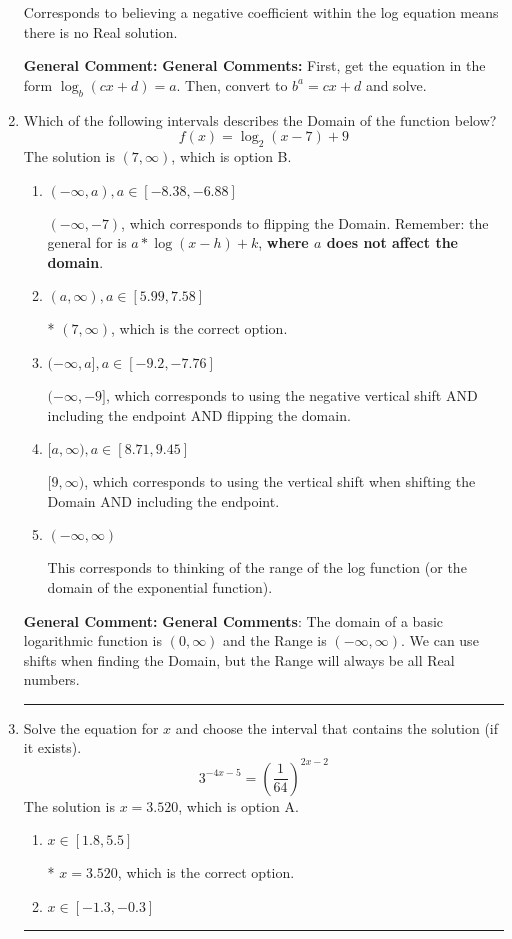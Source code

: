\documentclass{extbook}[14pt]
\newcommand{\litem}[1]{\item #1

\rule{\textwidth}{0.4pt}}
\begin{document}
\begin{enumerate}
{\begin{enumerate}[label=\Alph*.]
Corresponds to believing a negative coefficient within the log equation means there is no Real solution.
\end{enumerate}

\textbf{General Comment:} \textbf{General Comments:} First, get the equation in the form $\log_b{(cx+d)} = a$. Then, convert to $b^a = cx+d$ and solve.
}
\litem{
Which of the following intervals describes the Domain of the function below?
\[ f(x) = \log_2{(x-7)}+9 \]The solution is \( (7, \infty) \), which is option B.\begin{enumerate}[label=\Alph*.]
\item \( (-\infty, a), a \in [-8.38, -6.88] \)

$(-\infty, -7)$, which corresponds to flipping the Domain. Remember: the general for is $a*\log(x-h)+k$, \textbf{where $a$ does not affect the domain}.
\item \( (a, \infty), a \in [5.99, 7.58] \)

* $(7, \infty)$, which is the correct option.
\item \( (-\infty, a], a \in [-9.2, -7.76] \)

$(-\infty, -9]$, which corresponds to using the negative vertical shift AND including the endpoint AND flipping the domain.
\item \( [a, \infty), a \in [8.71, 9.45] \)

$[9, \infty)$, which corresponds to using the vertical shift when shifting the Domain AND including the endpoint.
\item \( (-\infty, \infty) \)

This corresponds to thinking of the range of the log function (or the domain of the exponential function).
\end{enumerate}

\textbf{General Comment:} \textbf{General Comments}: The domain of a basic logarithmic function is $(0, \infty)$ and the Range is $(-\infty, \infty)$. We can use shifts when finding the Domain, but the Range will always be all Real numbers.
}
\litem{
Solve the equation for $x$ and choose the interval that contains the solution (if it exists).
\[ 3^{-4x-5} = \left(\frac{1}{64}\right)^{2x-2} \]The solution is \( x = 3.520 \), which is option A.\begin{enumerate}[label=\Alph*.]
\item \( x \in [1.8, 5.5] \)

* $x = 3.520$, which is the correct option.
\item \( x \in [-1.3, -0.3] \)


\end{enumerate}}
\end{enumerate}
\end{document}
